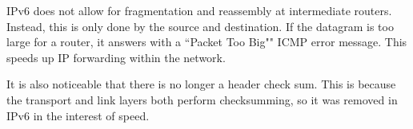 \documentclass[12pt,letterpaper]{book}
\theoremstyle{definition}
\begin{document}
IPv6 does not allow for fragmentation and reassembly at intermediate routers. Instead, this is only done by the source and destination. If the datagram is too large for a router, it answers with a ``Packet Too Big"" ICMP error message. This speeds up IP forwarding within the network.

It is also noticeable that there is no longer a header check sum. This is because the transport and link layers both perform checksumming, so it was removed in IPv6 in the interest of speed.
\end{document}
